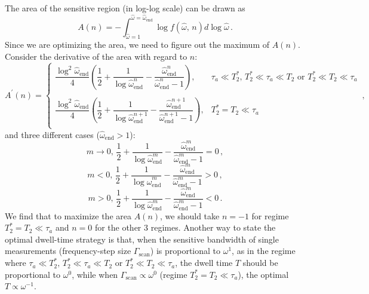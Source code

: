 The area of the sensitive region (in log-log scale) can be drawn as
\begin{equation}
    A(n) = -\int_{\hat{\omega}=1}^{\hat{\omega}=\hat{\omega}_{\mathrm{end}}} \log f(\hat{\omega},\, n) d\log\hat{\omega}
    \,.\label{eq:A_n}
\end{equation}
Since we are optimizing the area, we need to figure out the maximum of $A(n)$. Consider the derivative of the area with regard to $n$:
\begin{equation}
    A^{'}(n) = \left\{
    \begin{array}{ll}
    \dfrac{\log^2\hat{\omega}_{\mathrm{end}}}{4} 
    \left( 
    \dfrac{1}{2} + \dfrac{1}{\log \hat{\omega}_{\mathrm{end}}^n }
    -\dfrac{\hat{\omega}_{\mathrm{end}}^n }{ \hat{\omega}_{\mathrm{end}}^n-1 }    
    \right)
    ,
    & \tau_a\ll T_2^* ,\, T_2^*\ll\tau_a\ll T_2  \text{ or }  T_2^* \ll T_2 \ll \tau_a  \\
    & \\
    
    \dfrac{\log^2\hat{\omega}_{\mathrm{end}}}{4} 
    \left( 
    \dfrac{1}{2} + \dfrac{1}{\log \hat{\omega}_{\mathrm{end}}^{n+1} }
    -\dfrac{\hat{\omega}_{\mathrm{end}}^{n+1} }{ \hat{\omega}_{\mathrm{end}}^{n+1}-1 }    
    \right),
    &  T_2^*=T_2 \ll \tau_a  \\
    \end{array} \right.
    \,,\label{eq:dA_dn}
\end{equation}
and three different cases ($\hat{\omega}_{\mathrm{end}}>1$):
\begin{equation}
    m\to0,\,\dfrac{1}{2} + \dfrac{1}{\log \hat{\omega}_{\mathrm{end}}^m }
    -\dfrac{\hat{\omega}_{\mathrm{end}}^m }{ \hat{\omega}_{\mathrm{end}}^m-1 } = 0
    \,,
\end{equation}
\begin{equation}
    m<0,\,\dfrac{1}{2} + \dfrac{1}{\log \hat{\omega}_{\mathrm{end}}^m }
    -\dfrac{\hat{\omega}_{\mathrm{end}}^m }{ \hat{\omega}_{\mathrm{end}}^m-1 } > 0
    \,,
\end{equation}
\begin{equation}
    m>0,\,\dfrac{1}{2} + \dfrac{1}{\log \hat{\omega}_{\mathrm{end}}^m }
    -\dfrac{\hat{\omega}_{\mathrm{end}}^m }{ \hat{\omega}_{\text{end}}^m-1 } < 0
    \,.
\end{equation}
We find that to maximize the area $A(n)$, we should take $n=-1$ for regime $T_2^*=T_2 \ll \tau_a$ and $n=0$ for the other 3 regimes. 
Another way to state the optimal dwell-time strategy is that, when the sensitive bandwidth of single measurements (frequency-step size $\Gamma_{\mathrm{scan}}$) is proportional to $\omega^1$, as in the regime where $\tau_a\ll T_2^* ,\, T_2^*\ll\tau_a\ll T_2  \text{ or }  T_2^* \ll T_2 \ll \tau_a$, the dwell time $T$ should be proportional to $\omega^0$, while when $\Gamma_{\mathrm{scan}} \propto\omega^0$ (regime $T_2^*=T_2\ll\tau_a$), the optimal $T\propto\omega^{-1}$. 

